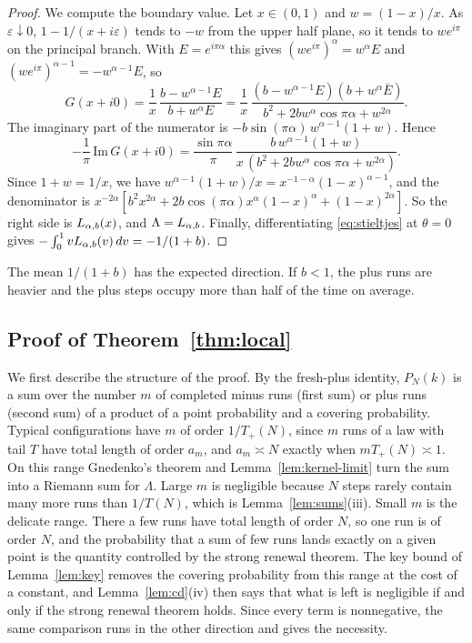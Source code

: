 \begin{proof}
We compute the boundary value. Let $x\in(0,1)$ and $w=(1-x)/x$. As
$\varepsilon\downarrow0$, $1-1/(x+i\varepsilon)$ tends to $-w$ from the upper half
plane, so it tends to $we^{i\pi}$ on the principal branch. With $E=e^{i\pi\alpha}$ this
gives $(we^{i\pi})^\alpha=w^\alpha E$ and $(we^{i\pi})^{\alpha-1}=-w^{\alpha-1}E$, so
\[
 G(x+i0)=\frac1x\,\frac{b-w^{\alpha-1}E}{b+w^\alpha E}
 =\frac1x\,\frac{(b-w^{\alpha-1}E)(b+w^\alpha\bar E)}{b^2+2bw^\alpha\cos\pi\alpha+w^{2\alpha}} .
\]
The imaginary part of the numerator is $-b\sin(\pi\alpha)\,w^{\alpha-1}(1+w)$. Hence
\[
 -\frac1\pi\,\mathrm{Im}\,G(x+i0)=\frac{\sin\pi\alpha}\pi\,
 \frac{b\,w^{\alpha-1}(1+w)}{x\,(b^2+2bw^\alpha\cos\pi\alpha+w^{2\alpha})}.
\]
Since $1+w=1/x$, we have $w^{\alpha-1}(1+w)/x=x^{-1-\alpha}(1-x)^{\alpha-1}$, and the
denominator is $x^{-2\alpha}[b^2x^{2\alpha}+2b\cos(\pi\alpha)x^\alpha(1-x)^\alpha+(1-x)^{2\alpha}]$.
So the right side is $L_{\alpha,b}(x)$, and $\Lambda=L_{\alpha,b}$. Finally, differentiating
\eqref{eq:stieltjes} at $\theta=0$ gives $-\int_0^1vL_{\alpha,b}(v)\,dv=-1/(1+b)$.
\end{proof}

The mean $1/(1+b)$ has the expected direction. If $b<1$, the plus runs are heavier
and the plus steps occupy more than half of the time on average.

\subsection{Proof of Theorem~\ref{thm:local}}\label{sec:local-proof}

We first describe the structure of the proof. By the fresh-plus identity, $P_N(k)$ is a sum
over the number $m$ of completed minus runs (first sum) or plus runs (second sum) of a product
of a point probability and a covering probability. Typical configurations have $m$ of order
$1/T_\plus(N)$, since $m$ runs of a law with tail $T$ have total length of order $a_m$, and
$a_m\asymp N$ exactly when $mT_\plus(N)\asymp1$. On this range Gnedenko's theorem and
Lemma~\ref{lem:kernel-limit} turn the sum into a Riemann sum for $\Lambda$. Large $m$ is
negligible because $N$ steps rarely contain many more runs than $1/T(N)$, which is
Lemma~\ref{lem:sums}(iii). Small $m$ is the delicate range. There a few runs have total length
of order $N$, so one run is of order $N$, and the probability that a sum of few runs lands
exactly on a given point is the quantity controlled by the strong renewal theorem. The key
bound of Lemma~\ref{lem:key} removes the covering probability from this range at the cost of a
constant, and Lemma~\ref{lem:cd}(iv) then says that what is left is negligible if and only if
the strong renewal theorem holds. Since every term is nonnegative, the same comparison runs in
the other direction and gives the necessity.

